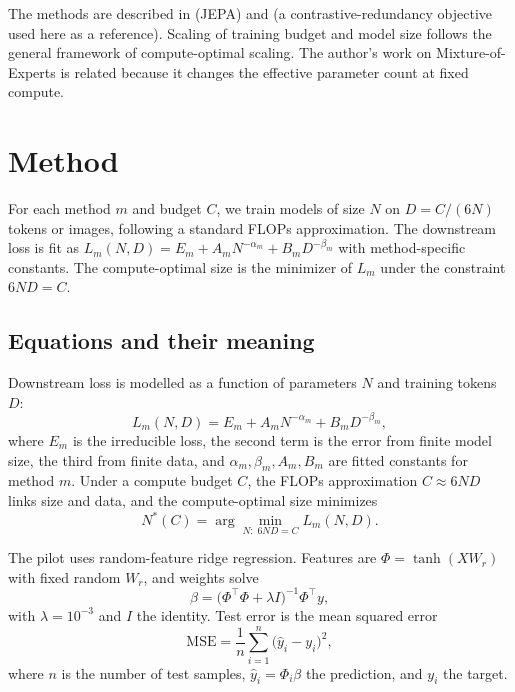 \documentclass[conference]{IEEEtran}
\begin{document}
The methods are described in \cite{bardes2024vjepa} (JEPA) and \cite{bardes2022vicreg} (a contrastive-redundancy objective used here as a reference). Scaling of training budget and model size follows the general framework of compute-optimal scaling. The author's work on Mixture-of-Experts \cite{d9moe} is related because it changes the effective parameter count at fixed compute.

\section{Method}
For each method $m$ and budget $C$, we train models of size $N$ on $D = C/(6N)$ tokens or images, following a standard FLOPs approximation. The downstream loss is fit as $L_m(N, D) = E_m + A_m N^{-\alpha_m} + B_m D^{-\beta_m}$ with method-specific constants. The compute-optimal size is the minimizer of $L_m$ under the constraint $6ND = C$.

\subsection*{Equations and their meaning}
Downstream loss is modelled as a function of parameters $N$ and training tokens $D$:
\begin{equation}
L_m(N,D)=E_m+A_m N^{-\alpha_m}+B_m D^{-\beta_m},
\end{equation}
where $E_m$ is the irreducible loss, the second term is the error from finite model size, the third from finite data, and $\alpha_m,\beta_m,A_m,B_m$ are fitted constants for method $m$. Under a compute budget $C$, the FLOPs approximation $C\approx 6ND$ links size and data, and the compute-optimal size minimizes
\begin{equation}
N^{*}(C)=\arg\min_{N:\;6ND=C} L_m(N,D).
\end{equation}

The pilot uses random-feature ridge regression. Features are $\Phi=\tanh(XW_r)$ with fixed random $W_r$, and weights solve
\begin{equation}
\beta=\big(\Phi^\top\Phi+\lambda I\big)^{-1}\Phi^\top y,
\end{equation}
with $\lambda=10^{-3}$ and $I$ the identity. Test error is the mean squared error
\begin{equation}
\mathrm{MSE}=\frac{1}{n}\sum_{i=1}^{n}\big(\hat y_i-y_i\big)^2,
\end{equation}
where $n$ is the number of test samples, $\hat y_i=\Phi_i\beta$ the prediction, and $y_i$ the target.
\end{document}
